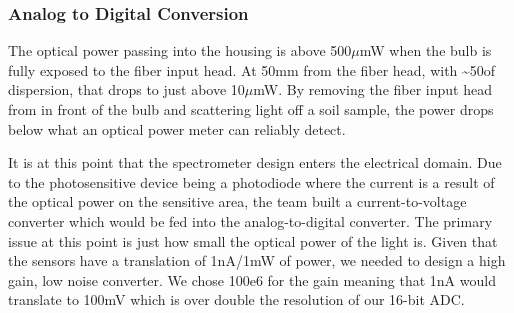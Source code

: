 \documentclass[journal]{IEEEtran}
\begin{document}
\subsubsection{Analog to Digital Conversion}
The optical power passing into the housing is above 500$\mu $mW when the bulb is fully exposed to the fiber input head. At 50mm from the fiber head, with \~{}50\textdegree of dispersion, that drops to just above 10$\mu $mW. By removing the fiber input head from in front of the bulb and scattering light off a soil sample, the power drops below what an optical power meter can reliably detect. 

It is at this point that the spectrometer design enters the electrical domain. Due to the photosensitive device being a photodiode where the current is a result of the optical power on the sensitive area, the team built a current-to-voltage converter which would be fed into the analog-to-digital converter. The primary issue at this point is just how small the optical power of the light is. Given that the sensors have a translation of 1nA/1mW of power, we needed to design a high gain, low noise converter. We chose 100e6 for the gain meaning that 1nA would translate to 100mV which is over double the resolution of our 16-bit ADC.
\end{document}
